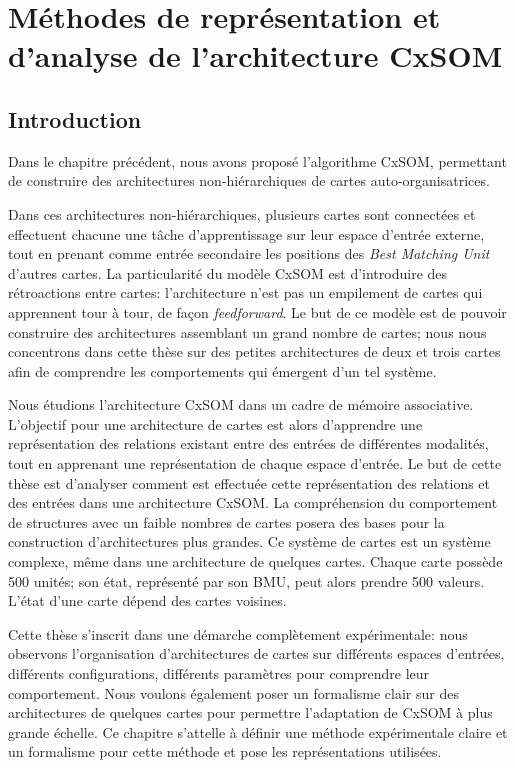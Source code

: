\chapter{Méthodes de représentation et d'analyse de l'architecture CxSOM}
\graphicspath{{03-Representation/}}
\minitoc

\section{Introduction}
Dans le chapitre précédent, nous avons proposé l'algorithme CxSOM, permettant de construire des architectures non-hiérarchiques de cartes auto-organisatrices. 

Dans ces architectures non-hiérarchiques, plusieurs cartes sont connectées et effectuent chacune une tâche d'apprentissage sur leur espace d'entrée externe, tout en prenant comme entrée secondaire les positions des \emph{Best Matching Unit} d'autres cartes. La particularité du modèle CxSOM est d'introduire des rétroactions entre cartes: l'architecture n'est pas un empilement de cartes qui apprennent tour à tour, de façon \emph{feedforward}.
Le but de ce modèle est de pouvoir construire des architectures assemblant un grand nombre de cartes; nous nous concentrons dans cette thèse sur des petites architectures de deux et trois cartes afin de comprendre les comportements qui émergent d'un tel système.

Nous étudions l'architecture CxSOM dans un cadre de mémoire associative.
L'objectif pour une architecture de cartes est alors d'apprendre une représentation des relations existant entre des entrées de différentes modalités, tout en apprenant une représentation de chaque espace d'entrée.
Le but de cette thèse est d'analyser comment est effectuée cette représentation des relations et des entrées dans une architecture CxSOM.
La compréhension du comportement de structures avec un faible nombres de cartes posera des bases pour la construction d'architectures plus grandes.
Ce système de cartes est un système complexe, même dans une architecture de quelques cartes. Chaque carte possède 500 unités; son état, représenté par son BMU, peut alors prendre 500 valeurs. L'état d'une carte dépend des cartes voisines.

Cette thèse s'inscrit dans une démarche complètement expérimentale: nous observons l'organisation d'architectures de cartes sur différents espaces d'entrées, différents configurations, différents paramètres pour comprendre leur comportement. Nous voulons également poser un formalisme clair sur des architectures de quelques cartes pour permettre l'adaptation de CxSOM à plus grande échelle.
Ce chapitre s'attelle à définir une méthode expérimentale claire et un formalisme pour cette méthode et pose les représentations utilisées.

